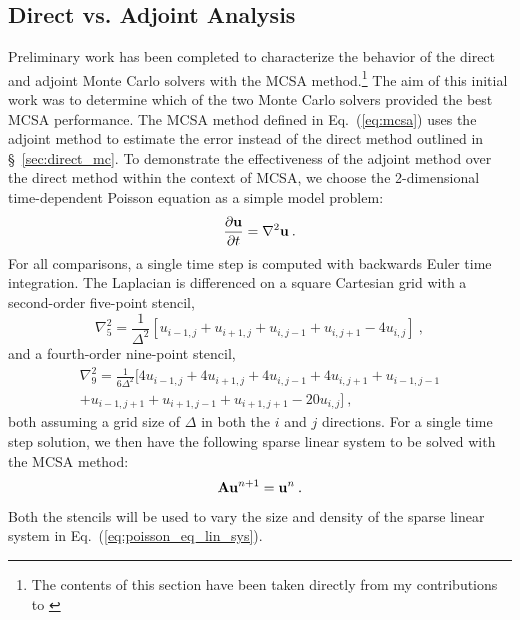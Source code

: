 \subsection{Direct vs. Adjoint Analysis}
\label{subsec:mcsa_direct_vs_adjoint}
Preliminary work has been completed to characterize the behavior of
the direct and adjoint Monte Carlo solvers with the MCSA
method.\footnote{The contents of this section have been taken directly
  from my contributions to \citep{evans_monte_2012}} The aim of this
initial work was to determine which of the two Monte Carlo solvers
provided the best MCSA performance. The MCSA method defined in
Eq.~(\ref{eq:mcsa}) uses the adjoint method to estimate the error
instead of the direct method outlined in \S~\ref{sec:direct_mc}. To
demonstrate the effectiveness of the adjoint method over the direct
method within the context of MCSA, we choose the 2-dimensional
time-dependent Poisson equation as a simple model problem:
\begin{equation}
  \frac{\partial \mathbf{u}}{\partial t} = \nabla^2 \mathbf{u}\:.
  \label{eq:poisson_equation}
\end{equation}
For all comparisons, a single time step is computed with backwards
Euler time integration. The Laplacian is differenced on a square
Cartesian grid with a second-order five-point stencil,
\begin{equation}
  \nabla^2_5 = \frac{1}{\Delta^2}[u_{i-1,j} + u_{i+1,j} + u_{i,j-1} +
    u_{i,j+1} - 4 u_{i,j}]\:,
  \label{eq:five_point_stencil}
\end{equation}
and a fourth-order nine-point stencil,
\begin{multline}
  \nabla^2_9 = \frac{1}{6\Delta^2}[4 u_{i-1,j} + 4 u_{i+1,j} + 4
    u_{i,j-1} + 4 u_{i,j+1} + u_{i-1,j-1}\\ + u_{i-1,j+1} +
    u_{i+1,j-1} + u_{i+1,j+1} - 20 u_{i,j}]\:,
  \label{eq:nine_point_stencil}
\end{multline}
both assuming a grid size of $\Delta$ in both the $i$ and $j$
directions. For a single time step solution, we then have the
following sparse linear system to be solved with the MCSA method:
\begin{equation}
  \mathbf{A} \mathbf{u}^{n+1} = \mathbf{u}^n\:.
  \label{eq:poisson_eq_lin_sys}
\end{equation}
Both the stencils will be used to vary the size and density of the
sparse linear system in Eq.~(\ref{eq:poisson_eq_lin_sys}).

